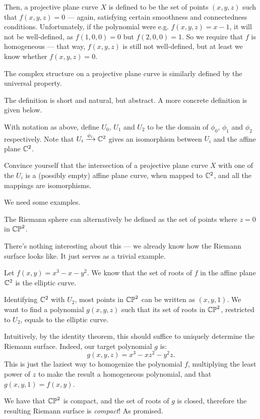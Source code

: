 Then, a projective plane curve $X$ is defined to be the set of points $(x, y, z)$ such that
$f(x, y, z) = 0$ --- again, satisfying certain smoothness and connectedness conditions.
Unfortunately, if the polynomial were e.g. $f(x, y, z) = x-1$, it will not be well-defined,
as $f(1, 0, 0) = 0$ but $f(2, 0, 0) = 1$.
So we require that $f$ is homogeneous --- that way, $f(x, y, z)$ is still not well-defined, but at
least we know whether $f(x, y, z) = 0$.

The complex structure on a projective plane curve is similarly defined by the universal property.

The definition is short and natural, but abstract. A more concrete definition is given below.
\begin{ques}
	With notation as above, define $U_0$, $U_1$ and $U_2$ to be the domain of $\phi_0$, $\phi_1$ and
	$\phi_2$ respectively.
	Note that $U_i \xrightarrow{\phi_i} \mathbb C^2$ gives an isomorphism between $U_i$ and the affine plane
	$\mathbb C^2$.

	Convince yourself that the intersection of a projective plane curve $X$ with one of the $U_i$ is
	a (possibly empty) affine plane curve, when mapped to $\mathbb C^2$, and all the mappings are
	isomorphisms.
\end{ques}

We need some examples.

\begin{example}
	The Riemann sphere can alternatively be defined as the set of points where $z = 0$ in $\mathbb{CP}^2$.

	There's nothing interesting about this --- we already know how the Riemann surface looks like.
	It just serves as a trivial example.
\end{example}

\begin{example}
	Let $f(x, y) = x^3-x-y^2$. We know that the set of roots of $f$ in the affine plane $\mathbb C^2$ is
	the elliptic curve.

	Identifying $\mathbb C^2$ with $U_2$, most points in $\mathbb{CP}^2$ can be written as $(x, y, 1)$.
	We want to find a polynomial $g(x, y, z)$ such that its set of roots in $\mathbb{CP}^2$, restricted to
	$U_2$, equals to the elliptic curve.

	Intuitively, by the identity theorem, this should suffice to uniquely determine the Riemann
	surface. Indeed, our target polynomial $g$ is:
	\[ g(x, y, z) = x^3-xz^2-y^2 z.  \]
	This is just the laziest way to homogenize the polynomial $f$, multiplying the least power of
	$z$ to make the result a homogeneous polynomial, and that $g(x, y, 1) = f(x, y)$.

	We have that $\mathbb{CP}^2$ is compact, and the set of roots of $g$ is closed, therefore the resulting
	Riemann surface is \emph{compact}! As promised.
\end{example}

